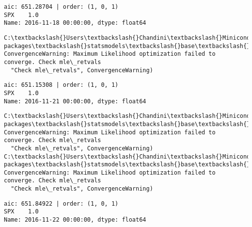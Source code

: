 \documentclass[11pt]{article}
\begin{document}
    \begin{Verbatim}[commandchars=\\\{\}]
aic: 651.28704 | order: (1, 0, 1)
SPX    1.0
Name: 2016-11-18 00:00:00, dtype: float64

    \end{Verbatim}

    \begin{Verbatim}[commandchars=\\\{\}]
C:\textbackslash{}Users\textbackslash{}Chandini\textbackslash{}Miniconda3\textbackslash{}envs\textbackslash{}auquan\textbackslash{}lib\textbackslash{}site-packages\textbackslash{}statsmodels\textbackslash{}base\textbackslash{}model.py:496: ConvergenceWarning: Maximum Likelihood optimization failed to converge. Check mle\_retvals
  "Check mle\_retvals", ConvergenceWarning)

    \end{Verbatim}

    \begin{Verbatim}[commandchars=\\\{\}]
aic: 651.15308 | order: (1, 0, 1)
SPX    1.0
Name: 2016-11-21 00:00:00, dtype: float64

    \end{Verbatim}

    \begin{Verbatim}[commandchars=\\\{\}]
C:\textbackslash{}Users\textbackslash{}Chandini\textbackslash{}Miniconda3\textbackslash{}envs\textbackslash{}auquan\textbackslash{}lib\textbackslash{}site-packages\textbackslash{}statsmodels\textbackslash{}base\textbackslash{}model.py:496: ConvergenceWarning: Maximum Likelihood optimization failed to converge. Check mle\_retvals
  "Check mle\_retvals", ConvergenceWarning)
C:\textbackslash{}Users\textbackslash{}Chandini\textbackslash{}Miniconda3\textbackslash{}envs\textbackslash{}auquan\textbackslash{}lib\textbackslash{}site-packages\textbackslash{}statsmodels\textbackslash{}base\textbackslash{}model.py:496: ConvergenceWarning: Maximum Likelihood optimization failed to converge. Check mle\_retvals
  "Check mle\_retvals", ConvergenceWarning)

    \end{Verbatim}

    \begin{Verbatim}[commandchars=\\\{\}]
aic: 651.84922 | order: (1, 0, 1)
SPX    1.0
Name: 2016-11-22 00:00:00, dtype: float64

    \end{Verbatim}
\end{document}
